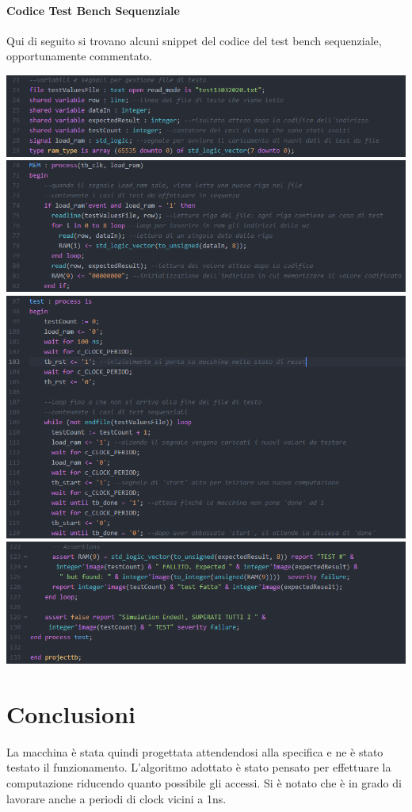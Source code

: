 \documentclass{article}
\begin{document}
\bigskip
\paragraph{Codice Test Bench Sequenziale}
%
Qui di seguito si trovano alcuni snippet del codice del test bench sequenziale, opportunamente commentato.
\begin{flushleft}
\includegraphics[scale=0.75]{sequential1} \\
\includegraphics[scale=0.75]{sequential2} \\
\includegraphics[scale=0.75]{sequential3} \\
\includegraphics[scale=0.75]{sequential4} \\
\end{flushleft}




\section{Conclusioni}
La macchina è stata quindi progettata attendendosi alla specifica e ne è stato testato il funzionamento. L'algoritmo adottato è stato pensato per effettuare la computazione riducendo quanto possibile gli accessi. Si è notato che è in grado di lavorare anche a periodi di clock vicini a 1ns.
\end{document}
